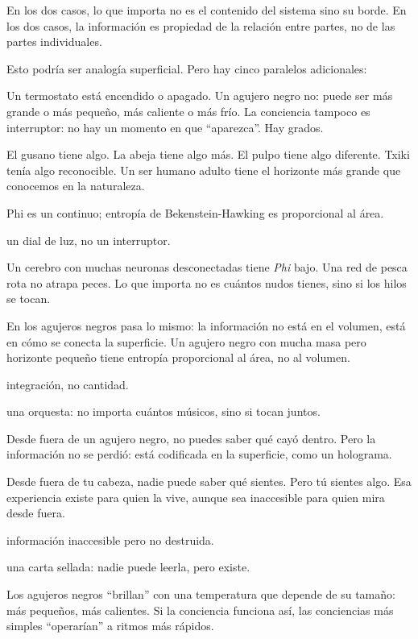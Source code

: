 En los dos casos, lo que importa no es el contenido del sistema sino su borde. En los dos casos, la información es propiedad de la relación entre partes, no de las partes individuales.

Esto podría ser analogía superficial. Pero hay cinco paralelos adicionales:

\noindent Un termostato está encendido o apagado. Un agujero negro no: puede ser más grande o más pequeño, más caliente o más frío. La conciencia tampoco es interruptor: no hay un momento en que “aparezca”. Hay grados.

El gusano tiene algo. La abeja tiene algo más. El pulpo tiene algo diferente. Txiki tenía algo reconocible. Un ser humano adulto tiene el horizonte más grande que conocemos en la naturaleza.

\begin{fisica}
 Phi es un continuo; entropía de Bekenstein-Hawking es proporcional al área.

 un dial de luz, no un interruptor.
\end{fisica}
\noindent Un cerebro con muchas neuronas desconectadas tiene \emph{Phi} bajo. Una red de pesca rota no atrapa peces. Lo que importa no es cuántos nudos tienes, sino si los hilos se tocan.

En los agujeros negros pasa lo mismo: la información no está en el volumen, está en cómo se conecta la superficie. Un agujero negro con mucha masa pero horizonte pequeño tiene entropía proporcional al área, no al volumen.

\begin{fisica}
 integración, no cantidad.

 una orquesta: no importa cuántos músicos, sino si tocan juntos.
\end{fisica}
\noindent Desde fuera de un agujero negro, no puedes saber qué cayó dentro. Pero la información no se perdió: está codificada en la superficie, como un holograma.

Desde fuera de tu cabeza, nadie puede saber qué sientes. Pero tú sientes algo. Esa experiencia existe para quien la vive, aunque sea inaccesible para quien mira desde fuera.

\begin{fisica}
 información inaccesible pero no destruida.

 una carta sellada: nadie puede leerla, pero existe.
\end{fisica}
\noindent Los agujeros negros “brillan” con una temperatura que depende de su tamaño: más pequeños, más calientes. Si la conciencia funciona así, las conciencias más simples “operarían” a ritmos más rápidos.

